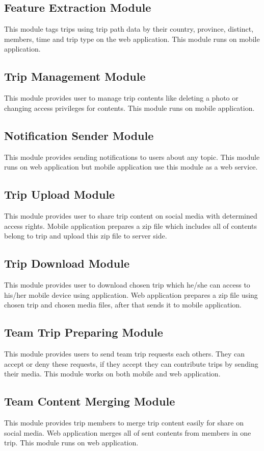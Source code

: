 \subsection{Feature Extraction Module}
This module tags trips using trip path data by their country, province, distinct, members, time and trip type on the web application. This module runs on mobile application.
\subsection{Trip Management Module}
This module provides user to manage trip contents like deleting a photo or changing access privileges for contents. This module runs on mobile application.
\subsection{Notification Sender Module}   
This module provides sending notifications to users about any topic. This module runs on web application but mobile application use this module as a web service.
\subsection{Trip Upload Module}
This module provides user to share trip content on social media with determined access rights. Mobile application prepares a zip file which includes all of contents belong to trip and upload this zip file to server side.
\subsection{Trip Download Module}
This module provides user to download chosen trip  which he/she can access to his/her mobile device using application. Web application prepares a zip file using chosen trip and chosen media files, after that sends it to mobile application.
\subsection{Team Trip Preparing Module}
This module provides users to send team trip requests each others. They can accept or deny these requests, if they accept they can contribute trips by sending their media. This module works on both mobile and web application.

\subsection{Team Content Merging Module}
This module provides trip members to merge trip content easily for share on social media. Web application merges all of sent contents from members in one trip. This module runs on web application.

